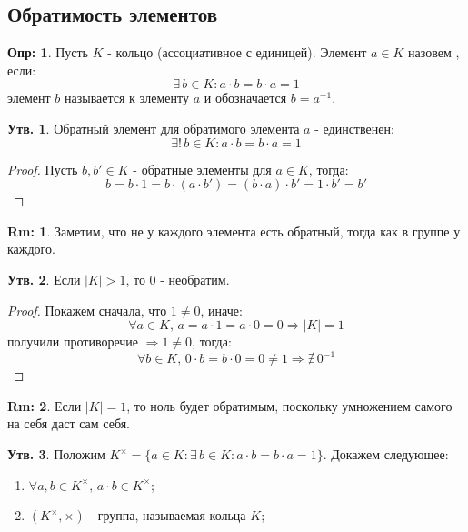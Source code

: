 \documentclass[12pt]{article}
\theoremstyle{definition}
\newtheorem{defn}{Опр:}
\newtheorem{rem}{Rm:}
\newtheorem{prop}{Утв.}
\begin{document}
\subsection*{Обратимость элементов}
\begin{defn}
	Пусть $K$ - кольцо (ассоциативное с единицей). Элемент $a\in K$ назовем , если:
	$$
		\exists \, b \in K \colon a{\cdot}b = b{\cdot}a = 1
	$$
	элемент $b$ называется  к элементу $a$ и обозначается $b = a^{-1}$. 
\end{defn}
\begin{prop}
	Обратный элемент для обратимого элемента $a$ - единственен:
	$$
		\exists! \, b \in K \colon a{\cdot}b = b{\cdot}a = 1
	$$
\end{prop}
\begin{proof}
	Пусть $b,b' \in K$ - обратные элементы для $a \in K$, тогда:
	$$
		b = b{\cdot}1 = b{\cdot}(a{\cdot}b') = (b{\cdot}a){\cdot}b' = 1{\cdot}b' = b'
	$$
\end{proof}

\begin{rem}
	Заметим, что не у каждого элемента есть обратный, тогда как в группе у каждого.
\end{rem}

\begin{prop}
	Если $|K| > 1$, то $0$ - необратим.
\end{prop}

\begin{proof}
	Покажем сначала, что $1 \neq 0$, иначе:
	$$
		\forall a \in K, \, a = a{\cdot}1 = a{\cdot}0 = 0 \Rightarrow |K| = 1
	$$
	получили противоречие $\Rightarrow 1 \neq 0$, тогда:
	$$
		\forall b \in K, \, 0{\cdot}b = b{\cdot}0 = 0 \neq 1 \Rightarrow \nexists \, 0^{-1}
	$$
\end{proof}

\begin{rem}
	Если $|K| =1$, то ноль будет обратимым, поскольку умножением самого на себя даст сам себя.
\end{rem}

\begin{prop}
	Положим $K^{\times} = \{a\in K \colon \exists \, b \in K \colon a{\cdot}b = b{\cdot}a = 1\}$. Докажем следующее:
	\begin{enumerate}[label=\arabic*)]
		\item $\forall a,b \in K^{\times}, \, a{\cdot}b \in K^{\times}$;
		\item $(K^{\times}, \times)$ - группа, называемая  кольца $K$;
	\end{enumerate}
\end{prop}
\end{document}
